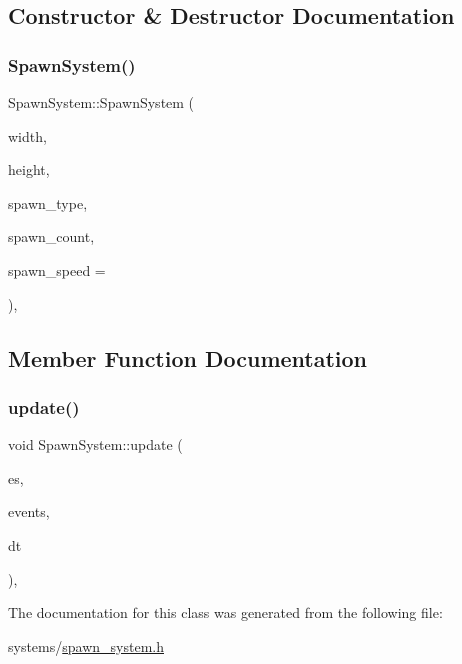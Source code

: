 \subsection{Constructor \& Destructor Documentation}
\mbox{\label{classSpawnSystem_aa7a033d898d3f8c993ad0af84c635c0b}} 
\subsubsection{\texorpdfstring{Spawn\+System()}{SpawnSystem()}}
{\footnotesize\ttfamily Spawn\+System\+::\+Spawn\+System (\begin{DoxyParamCaption}\item[{float}]{width,  }\item[{float}]{height,  }\item[{\hyperlink{spawn__system_8h_a2955cca9df1e3f8faa105a79669676dc}{Spawn\+Type}}]{spawn\+\_\+type,  }\item[{int}]{spawn\+\_\+count,  }\item[{int}]{spawn\+\_\+speed = {} }\end{DoxyParamCaption})\hspace{0.3cm}{\ttfamily [inline]}, {\ttfamily [explicit]}}



\subsection{Member Function Documentation}
\mbox{\label{classSpawnSystem_a881dab383c35a972c11bd4d8cff325a1}} 
\subsubsection{\texorpdfstring{update()}{update()}}
{\footnotesize\ttfamily void Spawn\+System\+::update (\begin{DoxyParamCaption}\item[{ex\+::\+Entity\+Manager \&}]{es,  }\item[{ex\+::\+Event\+Manager \&}]{events,  }\item[{ex\+::\+Time\+Delta}]{dt }\end{DoxyParamCaption})\hspace{0.3cm}{\ttfamily [inline]}, {\ttfamily [override]}}



The documentation for this class was generated from the following file\+:\begin{DoxyCompactItemize}
\item 
systems/\hyperlink{spawn__system_8h}{spawn\+\_\+system.\+h}\end{DoxyCompactItemize}
